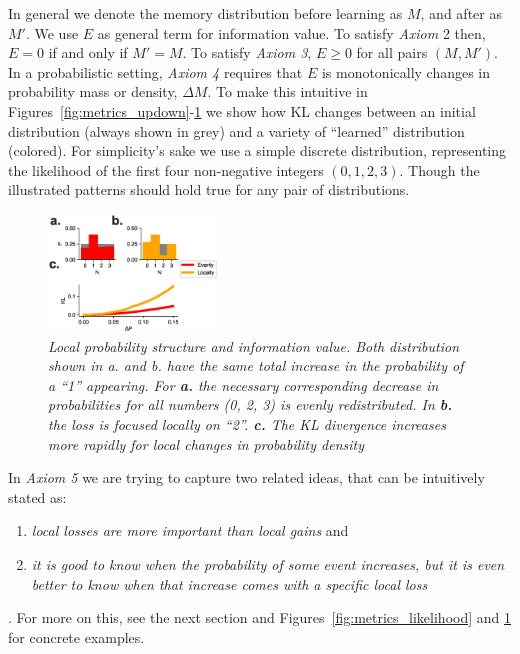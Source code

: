 \documentclass[9pt,twocolumn,twoside]{pnas-new}
\begin{document}
In general we denote the memory distribution before learning as $M$, and after as $M'$. We use $E$ as general term for information value. To satisfy \textit{Axiom} 2 then, $E = 0$ if and only if $M' = M$. To satisfy \textit{Axiom 3}, $E \geq 0$ for all pairs $(M, M')$. In a probabilistic setting, \textit{Axiom 4} requires that $E$ is monotonically changes in probability mass or density, $\Delta M$.  To make this intuitive in Figures~\ref{fig:metrics_updown}-\ref{fig:metrics_specifity} we show how KL changes between an initial distribution (always shown in grey) and a variety of ``learned'' distribution (colored). For simplicity's sake we use a simple discrete distribution, representing the likelihood of the first four non-negative integers $(0,1,2,3)$. Though the illustrated patterns should hold true for any pair of distributions.

\begin{figure}
\includegraphics[width=0.4\textwidth]{figures/metrics_specifity.eps}
\caption{
\textit{Local probability structure and information value. Both distribution shown in a. and b. have the same total increase in the probability of a ``1'' appearing.
For \textbf{a.}  the necessary corresponding decrease in probabilities for all numbers (0, 2, 3) is evenly redistributed.
In \textbf{b.} the loss is focused locally on ``2''. 
\textbf{c.} The KL divergence increases more rapidly for local changes in probability density}}
\label{fig:metrics_specifity}
\end{figure}

In \textit{Axiom 5} we are trying to capture two related ideas, that can be intuitively stated as: 
\begin{enumerate}
    \item \textit{local losses are more important than local gains} and
    \item \textit{it is good to know when the probability of some event increases, but it is even better to know when that increase comes with a specific local loss}
\end{enumerate}. For more on this, see the next section and Figures~\ref{fig:metrics_likelihood} and \ref{fig:metrics_specifity} for concrete examples.
\end{document}
